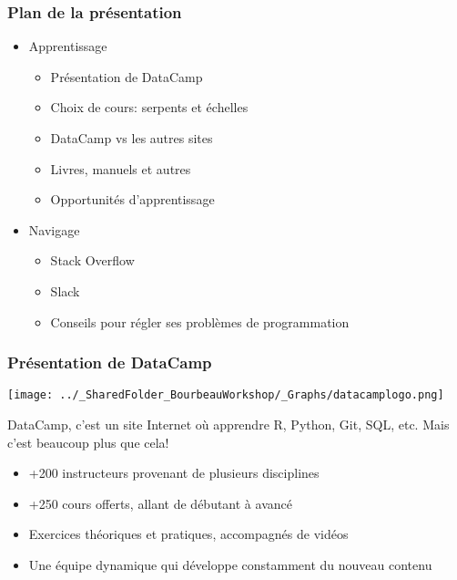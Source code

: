 \documentclass{beamer}
\begin{document}
    \begin{frame}
    
        \frametitle{Plan de la présentation} \vspace{1cm}
        
        \begin{itemize}
        
        \item{Apprentissage}
        
          \begin{itemize}
            \item Présentation de DataCamp 
            \item Choix de cours: serpents et échelles
            \item DataCamp vs les autres sites
            \item Livres, manuels et autres 
            \item Opportunités d'apprentissage
          \end{itemize}
        
         \item{Navigage}
         
          \begin{itemize}
            \item{Stack Overflow}
            \item{Slack}
            \item{Conseils pour régler ses problèmes de programmation}
          \end{itemize}
          
        \end{itemize}
        
    \end{frame}


    \begin{frame}
    
      \frametitle{Présentation de DataCamp} \vspace{1cm}
      
        \begin{center}
         \texttt{[image: ../\_SharedFolder\_BourbeauWorkshop/\_Graphs/datacamplogo.png]}
        \end{center} 
      
    DataCamp, c'est un site Internet où apprendre R, Python, Git, SQL, etc. Mais c'est beaucoup plus que cela!
    
        \begin{itemize}
          \item{+200 instructeurs provenant de plusieurs disciplines}
          \item{+250 cours offerts, allant de débutant à avancé}
          \item{Exercices théoriques et pratiques, accompagnés de vidéos}
          \item{Une équipe dynamique qui développe constamment du nouveau contenu}
        \end{itemize}
          
    \end{frame}
    
\end{document}
